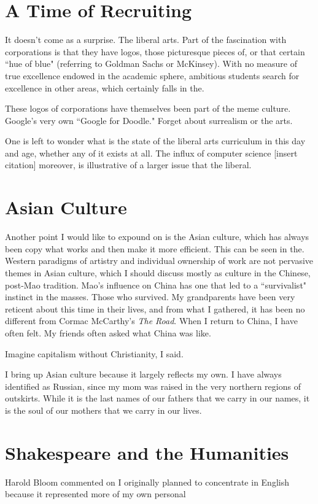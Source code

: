\documentclass[12pt,letterpaper]{article}
\begin{document}
\section{A Time of Recruiting}
It doesn't come as a surprise.  The liberal arts.  Part of the fascination with corporations is that they have logos, those picturesque pieces of, or that certain ``hue of blue" (referring to Goldman Sachs or McKinsey).  With no measure of true excellence endowed in the academic sphere, ambitious students search for excellence in other areas, which certainly falls in the.  

These logos of corporations have themselves been part of the meme culture.  Google's very own ``Google for Doodle."  Forget about surrealism or the arts.

One is left to wonder what is the state of the liberal arts curriculum in this day and age, whether any of it exists at all.  The influx of computer science [insert citation] moreover, is illustrative of a larger issue that the liberal.

\section{Asian Culture}
Another point I would like to expound on is the Asian culture, which has always been copy what works and then make it more efficient.  This can be seen in the.  Western paradigms of artistry and individual ownership of work are not pervasive themes in Asian culture, which I should discuss mostly as culture in the Chinese, post-Mao tradition.  Mao's influence on China has one that led to a ``survivalist" instinct in the masses.  Those who survived.  My grandparents have been very reticent about this time in their lives, and from what I gathered, it has been no different from Cormac McCarthy's \textit{The Road}.  When I return to China, I have often felt.  My friends often asked what China was like.  

Imagine capitalism without Christianity, I said.

I bring up Asian culture because it largely reflects my own.  I have always identified as Russian, since my mom was raised in the very northern regions of outskirts.  While it is the last names of our fathers that we carry in our names, it is the soul of our mothers that we carry in our lives.


\section{Shakespeare and the Humanities}
Harold Bloom commented on 
I originally planned to concentrate in English because it represented more of my own personal 
\end{document}

